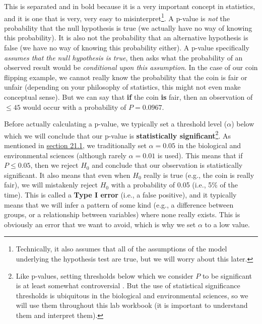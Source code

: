 \documentclass[
]{scrbook}
\begin{document}
This is separated and in bold because it is a very important concept in statistics, and it is one that is very, very easy to misinterpret\footnote{Technically, it also assumes that all of the assumptions of the model underlying the hypothesis test are true, but we will worry about this later.}.
A p-value is \emph{not} the probability that the null hypothesis is true (we actually have no way of knowing this probability).
It is also not the probability that an alternative hypothesis is false (we have no way of knowing this probability either).
A p-value specifically \emph{assumes that the null hypothesis is true}, then asks what the probability of an observed result would be \emph{conditional upon this assumption}.
In the case of our coin flipping example, we cannot really know the probability that the coin is fair or unfair (depending on your philosophy of statistics, this might not even make conceptual sense).
But we can say that \textbf{if} the coin \textbf{is} fair, then an observation of \(\leq 45\) would occur with a probability of \(P = 0.0967\).

Before actually calculating a p-value, we typically set a threshold level (\(\alpha\)) below which we will conclude that our p-value is \textbf{statistically significant}\footnote{Like p-values, setting thresholds below which we consider \(P\) to be significant is at least somewhat controversial \citep{McShane2019, Mayo2021}. But the use of statistical significance thresholds is ubiquitous in the biological and environmental sciences, so we will use them throughout this lab workbook (it is important to understand them and interpret them).}.
As mentioned in \protect\hyperlink{how-ridiculous-is-our-hypothesis}{section 21.1}, we traditionally set \(\alpha= 0.05\) in the biological and environmental sciences (although rarely \(\alpha = 0.01\) is used).
This means that if \(P \leq 0.05\), then we reject \(H_{0}\) and conclude that our observation is statistically significant.
It also means that even when \(H_{0}\) really is true (e.g., the coin is really fair), we will mistakenly reject \(H_{0}\) with a probability of 0.05 (i.e., 5\% of the time).
This is called a \textbf{Type I error} (i.e., a false positive), and it typically means that we will infer a pattern of some kind (e.g., a difference between groups, or a relationship between variables) where none really exists.
This is obviously an error that we want to avoid, which is why we set \(\alpha\) to a low value.
\end{document}
